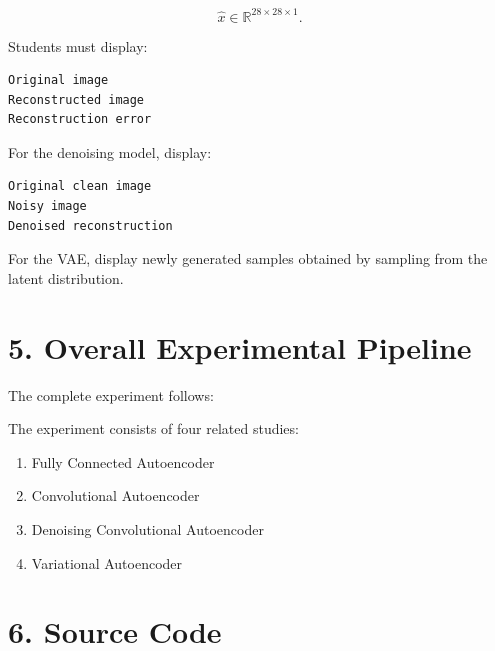 \documentclass[10pt]{article}
\begin{document}
\[
\hat{x}\in\mathbb{R}^{28\times28\times1}.
\]

Students must display:

\begin{verbatim}
Original image
Reconstructed image
Reconstruction error
\end{verbatim}

For the denoising model, display:

\begin{verbatim}
Original clean image
Noisy image
Denoised reconstruction
\end{verbatim}

For the VAE, display newly generated samples obtained by sampling from the
latent distribution.

\section*{5. Overall Experimental Pipeline}

The complete experiment follows:

\begin{center}
\end{center}

The experiment consists of four related studies:

\begin{enumerate}
\item Fully Connected Autoencoder
\item Convolutional Autoencoder
\item Denoising Convolutional Autoencoder
\item Variational Autoencoder
\end{enumerate}

\section*{6. Source Code}
\end{document}
